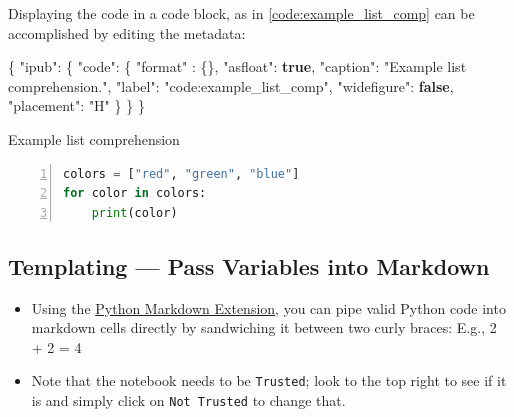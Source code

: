 \documentclass[10pt,parskip=half,
	toc=sectionentrywithdots,
	bibliography=totocnumbered,
	captions=tableheading,
    numbers=noendperiod,
    headings=standardclasses]{scrartcl}
\providecommand{\tightlist}{%
  \setlength{\itemsep}{0pt}\setlength{\parskip}{0pt}}
\newenvironment{Shaded}{}{}
\newcommand{\KeywordTok}[1]{\textcolor[rgb]{0.00,0.44,0.13}{\textbf{{#1}}}}
\newcommand{\DataTypeTok}[1]{\textcolor[rgb]{0.56,0.13,0.00}{{#1}}}
\newcommand{\StringTok}[1]{\textcolor[rgb]{0.25,0.44,0.63}{{#1}}}
\newcommand{\FunctionTok}[1]{\textcolor[rgb]{0.02,0.16,0.49}{{#1}}}
\begin{document}
Displaying the code in a code block, as in \cref{code:example_list_comp}
can be accomplished by editing the metadata:

\begin{Shaded}
\begin{Highlighting}[]
\FunctionTok{\{}
\DataTypeTok{"ipub"}\FunctionTok{:} \FunctionTok{\{}
  \DataTypeTok{"code"}\FunctionTok{:} \FunctionTok{\{}
  \DataTypeTok{"format"} \FunctionTok{:} \FunctionTok{\{\},}
    \DataTypeTok{"asfloat"}\FunctionTok{:} \KeywordTok{true}\FunctionTok{,}
    \DataTypeTok{"caption"}\FunctionTok{:} \StringTok{"Example list comprehension."}\FunctionTok{,}
    \DataTypeTok{"label"}\FunctionTok{:} \StringTok{"code:example_list_comp"}\FunctionTok{,}
    \DataTypeTok{"widefigure"}\FunctionTok{:} \KeywordTok{false}\FunctionTok{,}
    \DataTypeTok{"placement"}\FunctionTok{:} \StringTok{"H"}
    \FunctionTok{\}}
  \FunctionTok{\}}
\FunctionTok{\}}
\end{Highlighting}
\end{Shaded}

\begin{codecell}[H]

    \caption{Example list comprehension}\label{code:example_list_comp}\begin{lstlisting}[language=Python,numbers=left,xleftmargin=20pt,xrightmargin=5pt,belowskip=5pt,aboveskip=5pt]
colors = ["red", "green", "blue"]
for color in colors:
    print(color)
\end{lstlisting}\end{codecell}

\subsection{Templating --- Pass Variables into
Markdown}\label{templating-pass-variables-into-markdown}

\begin{itemize}
\tightlist
\item
  Using the
  \href{https://jupyter-contrib-nbextensions.readthedocs.io/en/latest/nbextensions/python-markdown/readme.html}{Python
  Markdown Extension}, you can pipe valid Python code into markdown
  cells directly by sandwiching it between two curly braces: E.g., 2 + 2
  = 4
\item
  Note that the notebook needs to be \texttt{Trusted}; look to the top
  right to see if it is and simply click on \texttt{Not\ Trusted} to
  change that.
\end{itemize}
\end{document}
